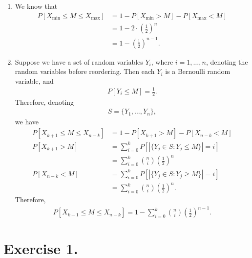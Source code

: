 \begin{enumerate}
	\item We know that
	\begin{align*}
	P[X_{\min} \leq M \leq X_{\max}] & = 1 - P[X_{\min} > M] - P[X_{\max} < M] \\
	& = 1 - 2\cdot \left(\frac{1}{2} \right)^n \\
	& = 1 - \left(\frac{1}{2} \right)^{n-1}.
	\end{align*}
	\item Suppose we have a set of random variables $Y_i$, where $i = 1, \ldots, n$, denoting the random variables before reordering. Then each $Y_i$ is a Bernoulli random variable, and
	\begin{align*}
	P[Y_i\leq M] = \frac{1}{2}.
	\end{align*}
	Therefore, denoting
	\begin{align*}
	S = \{Y_1, \ldots, Y_n \},
	\end{align*}
	we have
	\begin{align*}
	P[X_{k+1}\leq M\leq X_{n-k}] & = 1 - P[X_{k+1} > M] - P[X_{n-k} < M] \\
	P[X_{k+1} > M] & = \sum_{i=0}^k P\left[\left|\{Y_j\in S: Y_j \leq M \}\right| = i\right] \\
	& = \sum_{i=0}^k\binom{n}{i}\left(\frac{1}{2} \right)^n \\
	P[X_{n-k} < M] & = \sum_{i=0}^k P\left[\left|\{Y_j\in S: Y_j \geq M \}\right| = i\right] \\
	& = \sum_{i=0}^k \binom{n}{i} \left(\frac{1}{2} \right)^n.
	\end{align*}
	Therefore,
	\begin{align*}
	P[X_{k+1}\leq M\leq X_{n-k}] = 1 - \sum_{i=0}^k \binom{n}{i} \left(\frac{1}{2} \right)^{n-1}.
	\end{align*}
\end{enumerate}



\section*{Exercise 1.}

